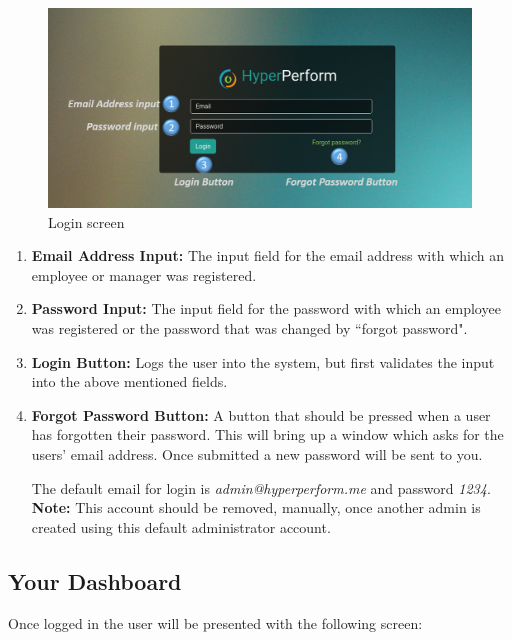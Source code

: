 \documentclass[11pt,a4paper]{article}
\begin{document}
\begin{figure}[H]
	\begin{center}
		\includegraphics[scale=0.3]{../Images/Getting_Started/Login_numbered}
		\caption{Login screen}
	\end{center}
\end{figure}
\begin{enumerate}
	\item \textbf{Email Address Input:} The input field for the email address with which an employee or manager was registered.
	\item \textbf{Password Input:} The input field for the password with which an employee was registered or the password that was changed by ``forgot password".
	\item \textbf{Login Button:} Logs the user into the system, but first validates the input into the above mentioned fields. 
	\item \textbf{Forgot Password Button:} A button that should be pressed when a user has forgotten their password. This will bring up a window which asks for the users' email address. Once submitted a new password will be sent to you. 
	
	The default email for login is \textit{admin@hyperperform.me} and password \textit{1234}.\\ \textbf{Note:} This account should be removed, manually, once another admin is created using this default administrator account. 
\end{enumerate}
\pagebreak
\subsection{Your Dashboard}
Once logged in the user will be presented with the following screen:
\end{document}
